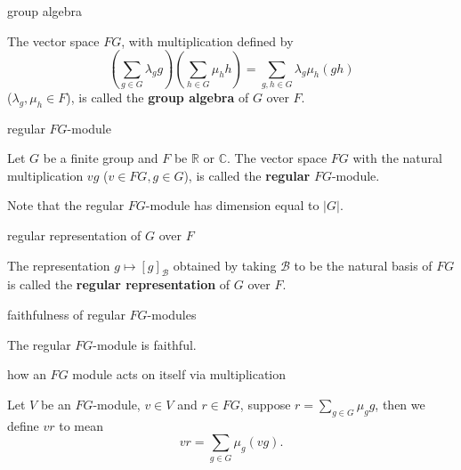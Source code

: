 \documentclass[avery5371,grid]{flashcards}
\newcommand{\R}{\mathbb{R}}
\newcommand{\C}{\mathbb{C}}
\newcommand{\B}{\mathscr{B}}
\newcommand{\abs}[1]{\ensuremath{\left| #1 \right|}}
\newcommand{\defn}[1]{\textbf{#1}}
\begin{document}
\begin{flashcard}[Definition 6.3]{group algebra}

  The vector space $FG$, with multiplication defined by
  \[
    \left( \sum_{g\in G} \lambda_g g \right) \left( \sum_{h\in G}
      \mu_h h \right) = \sum_{g,h \in G} \lambda_g \mu_h (gh)
  \]
  ($\lambda_g, \mu_h \in F$), is called the \defn{group algebra} of
  $G$ over $F$.

\end{flashcard}

\begin{flashcard}[Definition 6.5]{regular $FG$-module}

  Let $G$ be a finite group and $F$ be $\R$ or $\C$. The vector space
  $FG$ with the natural multiplication $vg$ ($v \in FG, g \in G$), is
  called the \defn{regular} $FG$-module.

  \bigskip

  Note that the regular $FG$-module has dimension equal to $\abs{G}$.

\end{flashcard}

\begin{flashcard}[Definition 6.5]{regular representation of $G$ over
    $F$}

  The representation $g \mapsto [g]_{\B}$ obtained by taking $\B$ to
  be the natural basis of $FG$ is called the \defn{regular
    representation} of $G$ over $F$.

\end{flashcard}

\begin{flashcard}[Proposition 6.6]{faithfulness of regular
    $FG$-modules}

  The regular $FG$-module is faithful.

\end{flashcard}

\begin{flashcard}[Definition 6.8]{how an $FG$ module acts on itself
    via multiplication}

  Let $V$ be an $FG$-module, $v \in V$ and $r \in FG$, suppose
  $r = \sum_{g\in G} \mu_g g$, then we define $vr$ to mean
  \[
    vr = \sum_{g \in G} \mu_g(vg).
  \]

\end{flashcard}
\end{document}
